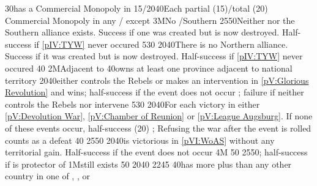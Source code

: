 %
%
{}{30}{\paysmajeurFrance has a Commercial Monopoly in }%
%
%
%
{15/20}{40}{Each partial (15)/total (20) Commercial Monopoly in any \STZ/\CTZ
  except }%
%
%
\EUobjective3M{No \GE/Southern \HRE}{}%
{25}{50}{Neither \GE nor the Southern \HRE alliance exists. Success if one was
  created but is now destroyed. Half-success if \ref{pIV:TYW} never occured}%
%
%
{5}{30}{}%
%
%
{20}{40}{There is no Northern \HRE alliance. Success if it was created but is
  now destroyed. Half-success if \ref{pIV:TYW} never occured}%
%
%
%
{}{40}{}%
%
\EUobjective2M{Adjacent to \HOL}{}%
{}{40}{\paysmajeurFrance owns at least one province adjacent to
  \paysmajeurHollande national territory}%
%
%
{20}{40}{\paysmajeurFrance either controls the Rebels or makes an intervention
  in \ref{pV:Glorious Revolution} and wins; half-success if the event does not
  occur ; failure if \paysmajeurFrance neither controls the Rebels nor
  intervene}%
%
%
{5}{30}{}%
%
%
{20}{40}{For each victory in either \ref{pV:Devolution War}, \ref{pV:Chamber
    of Reunion} or \ref{pV:League Augsburg}. If none of these events occur,
  half-success (20\VPs) ; Refusing the war after the event is rolled counts as
  a defeat}%
%
%
%
{}{40}{}%
%
%
{25}{50}{\EU@objWoSS}%
%
%
{20}{40}{\paysmajeurFrance is victorious in \ref{pVI:WoAS} without any
  territorial gain. Half-success if the event does not occur}%
%
\EUobjective4M{}{}%
{}{50}{}%
%
%
{25}{50}{\EU@objPOLVictory; half-success if \paysmajeurSuede is protector of
  \paysPologne}%
%
%
\EUobjective1M{\payspologne still exists}{}%
{}{50}{}%
%
%
{20}{40}{\EU@objEachCC}%
%
%
{22}{45}{\EU@objIndependanceWars}%
%
%
{}{40}{\paysmajeurFrance has more \TP plus \COL than any other country in
  one of , , or
  }%
%
%
%
